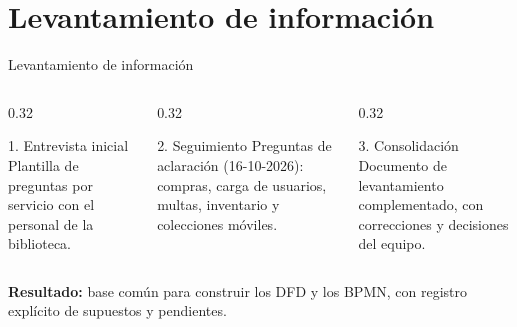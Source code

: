 \documentclass[aspectratio=169,10pt]{beamer}
\begin{document}
\section{Levantamiento de información}
\begin{frame}{Levantamiento de información}
  \begin{columns}[T]
    \begin{column}{0.32\textwidth}
      \begin{block}{1. Entrevista inicial}
        \small Plantilla de preguntas por servicio con el personal de la biblioteca.
      \end{block}
    \end{column}
    \begin{column}{0.32\textwidth}
      \begin{block}{2. Seguimiento}
        \small Preguntas de aclaración (16-10-2026): compras, carga de usuarios,
        multas, inventario y colecciones móviles.
      \end{block}
    \end{column}
    \begin{column}{0.32\textwidth}
      \begin{block}{3. Consolidación}
        \small Documento de levantamiento complementado, con correcciones y
        decisiones del equipo.
      \end{block}
    \end{column}
  \end{columns}

  \vspace{1em}
  \textbf{Resultado:} base común para construir los DFD y los BPMN, con
  registro explícito de supuestos y pendientes.
\end{frame}

\end{document}
